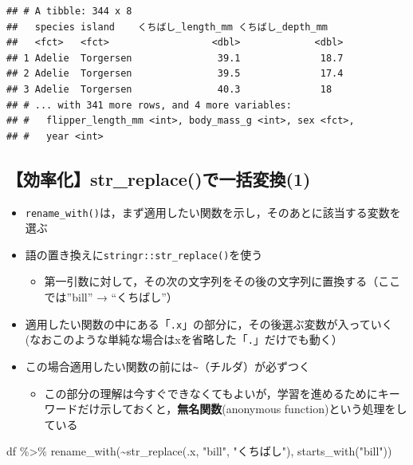 \documentclass[
  xelatex,ja=standard, b5paper]{bxjsbook}
\newenvironment{Shaded}{\begin{snugshade}}{\end{snugshade}}
\newcommand{\FunctionTok}[1]{\textcolor[rgb]{0.00,0.00,0.00}{#1}}
\newcommand{\NormalTok}[1]{#1}
\newcommand{\SpecialCharTok}[1]{\textcolor[rgb]{0.00,0.00,0.00}{#1}}
\newcommand{\StringTok}[1]{\textcolor[rgb]{0.31,0.60,0.02}{#1}}
\providecommand{\tightlist}{%
  \setlength{\itemsep}{0pt}\setlength{\parskip}{0pt}}
\begin{document}
\begin{verbatim}
## # A tibble: 344 x 8
##   species island    くちばし_length_mm くちばし_depth_mm
##   <fct>   <fct>                  <dbl>             <dbl>
## 1 Adelie  Torgersen               39.1              18.7
## 2 Adelie  Torgersen               39.5              17.4
## 3 Adelie  Torgersen               40.3              18  
## # ... with 341 more rows, and 4 more variables:
## #   flipper_length_mm <int>, body_mass_g <int>, sex <fct>,
## #   year <int>
\end{verbatim}

\hypertarget{rename-strreplace1}{%
\subsection{【効率化】str\_replace()で一括変換(1)}\label{rename-strreplace1}}

\begin{itemize}
\tightlist
\item
  \texttt{rename\_with()}は，まず適用したい関数を示し，そのあとに該当する変数を選ぶ
\item
  語の置き換えに\texttt{stringr::str\_replace()}を使う

  \begin{itemize}
  \tightlist
  \item
    第一引数に対して，その次の文字列をその後の文字列に置換する（ここでは''bill'' → ``くちばし''）
  \end{itemize}
\item
  適用したい関数の中にある「\texttt{.x}」の部分に，その後選ぶ変数が入っていく(なおこのような単純な場合はxを省略した「\texttt{.}」だけでも動く）
\item
  この場合適用したい関数の前には\texttt{\textasciitilde{}}（チルダ）が必ずつく

  \begin{itemize}
  \tightlist
  \item
    この部分の理解は今すぐできなくてもよいが，学習を進めるためにキーワードだけ示しておくと，\textbf{無名関数}(anonymous function)という処理をしている
  \end{itemize}
\end{itemize}

\begin{Shaded}
\begin{Highlighting}[]
\NormalTok{df }\SpecialCharTok{\%\textgreater{}\%} 
  \FunctionTok{rename\_with}\NormalTok{(}\SpecialCharTok{\textasciitilde{}}\FunctionTok{str\_replace}\NormalTok{(.x, }\StringTok{"bill"}\NormalTok{, }\StringTok{"くちばし"}\NormalTok{),}
              \FunctionTok{starts\_with}\NormalTok{(}\StringTok{"bill"}\NormalTok{))}
\end{Highlighting}
\end{Shaded}
\end{document}
